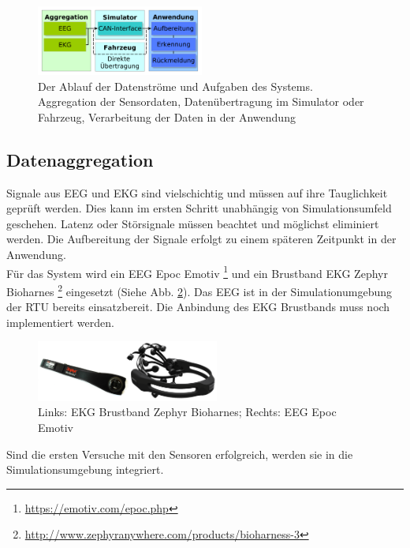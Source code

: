 {\begin{figure}[h] 
  \begin{center}
    \includegraphics[width=5.5cm]{img/block}
    \caption{Der Ablauf der Datenströme und Aufgaben des Systems. Aggregation der Sensordaten, Datenübertragung im Simulator oder Fahrzeug, Verarbeitung der Daten in der Anwendung}
    \label{fig:block}
  \end{center}
\end{figure}

\subsection{Datenaggregation}
Signale aus EEG und EKG sind vielschichtig und müssen auf ihre Tauglichkeit geprüft werden. Dies kann im ersten Schritt unabhängig von Simulationsumfeld geschehen. Latenz oder Störsignale müssen beachtet und möglichst eliminiert werden. Die Aufbereitung der Signale erfolgt zu einem späteren Zeitpunkt in der Anwendung. \\

Für das System wird ein EEG Epoc Emotiv \footnote{\url{https://emotiv.com/epoc.php}} und ein Brustband EKG Zephyr Bioharnes \footnote{\url{http://www.zephyranywhere.com/products/bioharness-3}} eingesetzt (Siehe Abb. \ref{fig:sensors}). Das EEG ist in der Simulationumgebung der \acl{RTU} bereits einsatzbereit. Die Anbindung des EKG Brustbands muss noch implementiert werden.

\begin{figure}[h] 
  \begin{center}
    \includegraphics[width=6cm]{img/sensors}
    \caption{Links: EKG Brustband Zephyr Bioharnes; Rechts: EEG Epoc Emotiv}
    \label{fig:sensors}
  \end{center}
\end{figure}

Sind die ersten Versuche mit den Sensoren erfolgreich, werden sie in die Simulationsumgebung integriert.


}
